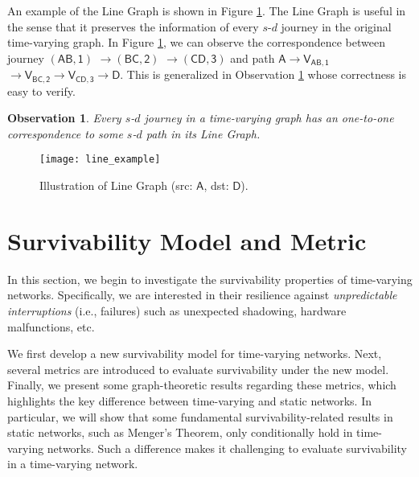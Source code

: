 \documentclass[10pt, conference, letterpaper]{IEEEtran}
\newtheorem{observation}{Observation}
\begin{document}
\noindent An example of the Line Graph is shown in Figure \ref{line_example}. The Line Graph is useful in the sense that it preserves the information of every $s$-$d$ journey in the original time-varying graph. In Figure \ref{line_example}, we can observe the correspondence between journey $\mathsf{(AB,1)}$ $\mathsf{\rightarrow (BC,2)}$ $\mathsf{\rightarrow (CD,3)}$  and path $\mathsf{A\rightarrow V_{AB,1}}$ $\mathsf{\rightarrow V_{BC,2} \rightarrow V_{CD,3}\rightarrow D}$. This is generalized in Observation \ref{line_corre} whose correctness is easy to verify.
\begin{observation}\label{line_corre}
Every $s$-$d$ journey in a time-varying graph has an one-to-one correspondence to some $s$-$d$ path in its Line Graph.
\end{observation}\vspace{-5mm}





\begin{figure}[ht]
\begin{center}
\texttt{[image: line\_example]}
\caption{Illustration of Line Graph (src: $\mathsf{A}$, dst: $\mathsf{D}$). }
\label{line_example}
\end{center}\vspace{-3mm}
\end{figure}


\section{Survivability Model and Metric}\label{survive_model}
In this section, we begin to investigate the survivability properties of time-varying networks. Specifically, we are interested in their resilience against \emph{unpredictable interruptions} (i.e., failures) such as unexpected shadowing, hardware malfunctions, etc. 

We first develop a new survivability model for time-varying networks. Next, several metrics are introduced to evaluate  survivability under the new model. Finally, we  present some graph-theoretic results regarding these metrics, which highlights the key difference between time-varying and static networks. In particular, we will show that some fundamental survivability-related
results in static networks, such as Menger's Theorem, only conditionally hold in time-varying networks. Such a difference makes it challenging to evaluate survivability in a time-varying network.
\end{document}

